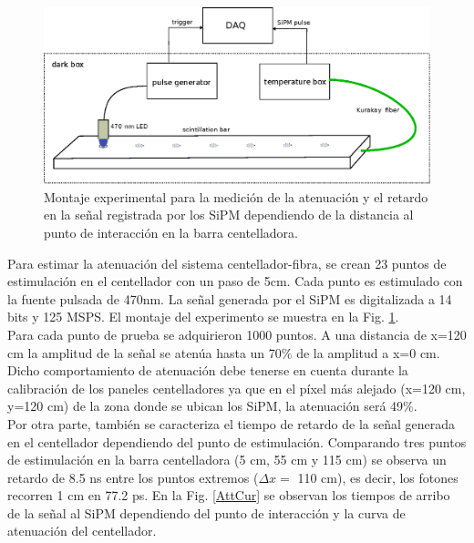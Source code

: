 \begin{figure}[h!]
\centering
\includegraphics[scale=0.75]{Figures/BarAtt.eps}
\caption{Montaje experimental para la medición de la atenuación y el retardo en la señal registrada por los SiPM dependiendo de la distancia al punto de interacción en la barra centelladora.}
\label{AtTest}
\end{figure}

Para estimar la atenuación del sistema centellador-fibra, se crean 23 puntos de estimulación en el centellador con un paso de 5cm. Cada punto es estimulado con la fuente pulsada de 470nm. La señal generada por el SiPM es digitalizada a 14 bits y 125 MSPS. El montaje del experimento se muestra en la Fig. \ref{AtTest}.\\

Para cada punto de prueba se adquirieron 1000 puntos. A una distancia de x=120 cm la amplitud de la señal se atenúa hasta un 70$\%$ de la amplitud a x=0 cm. Dicho comportamiento de atenuación debe tenerse en cuenta durante la calibración de los paneles centelladores ya que en el píxel más alejado (x=120 cm, y=120 cm) de la zona donde se ubican los SiPM, la atenuación será 49$\%$.\\

Por otra parte, también se caracteriza el tiempo de retardo de la señal generada en el centellador dependiendo del punto de estimulación. Comparando tres puntos de estimulación en la barra centelladora (5 cm, 55 cm y 115 cm) se observa un retardo de 8.5 ns entre los puntos extremos ($\Delta x =$ 110 cm), es decir, los fotones recorren 1 cm en 77.2 ps. En la Fig. \ref{AttCur} se observan los tiempos de arribo de la señal al SiPM dependiendo del punto de interacción y la curva de atenuación del centellador.

